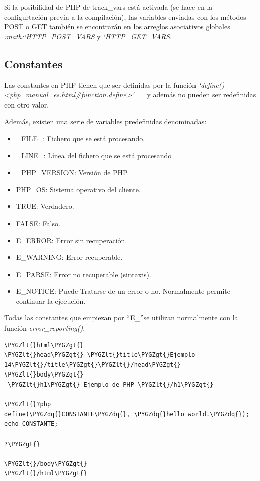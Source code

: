 \documentclass[a5paper,10pt,spanish]{sphinxmanual}
\def\PYGZlt{\char`\<}
\def\PYGZgt{\char`\>}
\def\PYGZdq{\char`\"}
\begin{document}
Si la posibilidad de PHP de track\_vars está activada (se hace en la
configurtación previa a la compilación), las variables enviadas con los
métodos POST o GET también se encontrarán en los arreglos asociativos
globales \emph{:math:{}`HTTP\_POST\_VARS} y \emph{{}`HTTP\_GET\_VARS}.


\subsection{Constantes}
\label{Tutorial1_Conceptos.md:constantes}
Las constantes en PHP tienen que ser definidas por la función
\emph{{}`define() \textless{}php\_manual\_es.html\#function.define\textgreater{}{}`\_\_} y además no pueden
ser redefinidas con otro valor.

Además, existen una serie de variables predefinidas denominadas:
\begin{itemize}
\item {} 
\_FILE\_: Fichero que se está procesando.

\item {} 
\_LINE\_: Línea del fichero que se está procesando

\item {} 
\_PHP\_VERSION: Versión de PHP.

\item {} 
PHP\_OS: Sistema operativo del cliente.

\item {} 
TRUE: Verdadero.

\item {} 
FALSE: Falso.

\item {} 
E\_ERROR: Error sin recuperación.

\item {} 
E\_WARNING: Error recuperable.

\item {} 
E\_PARSE: Error no recuperable (sintaxis).

\item {} 
E\_NOTICE: Puede Tratarse de un error o no. Normalmente permite
continuar la ejecución.

\end{itemize}

Todas las constantes que empiezan por ``E\_''se utilizan normalmente con
la función \emph{error\_reporting()}.

\begin{Verbatim}[commandchars=\\\{\}]
\PYGZlt{}html\PYGZgt{}
\PYGZlt{}head\PYGZgt{} \PYGZlt{}title\PYGZgt{}Ejemplo 14\PYGZlt{}/title\PYGZgt{}\PYGZlt{}/head\PYGZgt{}
\PYGZlt{}body\PYGZgt{}
 \PYGZlt{}h1\PYGZgt{} Ejemplo de PHP \PYGZlt{}/h1\PYGZgt{}

\PYGZlt{}?php
define(\PYGZdq{}CONSTANTE\PYGZdq{}, \PYGZdq{}hello world.\PYGZdq{});
echo CONSTANTE;

?\PYGZgt{}

\PYGZlt{}/body\PYGZgt{}
\PYGZlt{}/html\PYGZgt{}
\end{Verbatim}
\end{document}
